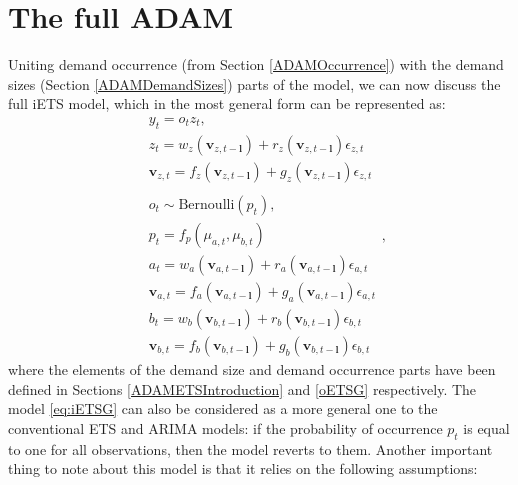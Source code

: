 \documentclass[
]{book}
\theoremstyle{definition}
\theoremstyle{definition}
\theoremstyle{definition}
\theoremstyle{definition}
\theoremstyle{remark}
\begin{document}
\hypertarget{ADAMIntermittentFull}{%
\section{The full ADAM}\label{ADAMIntermittentFull}}

Uniting demand occurrence (from Section \ref{ADAMOccurrence}) with the demand sizes (Section \ref{ADAMDemandSizes}) parts of the model, we can now discuss the full iETS model, which in the most general form can be represented as:
\begin{equation}
\begin{aligned}
& y_t = o_t z_t , \\
& {z}_{t} = w_z(\mathbf{v}_{z,t-\mathbf{l}}) + r_z(\mathbf{v}_{z,t-\mathbf{l}}) \epsilon_{z,t} \\
& \mathbf{v}_{z,t} = f_z(\mathbf{v}_{z,t-\mathbf{l}}) + g_z(\mathbf{v}_{z,t-\mathbf{l}}) \epsilon_{z,t} \\
& \\
& o_t \sim \text{Bernoulli} \left(p_t \right) , \\
& p_t = f_p(\mu_{a,t}, \mu_{b,t}) \\
& a_t = w_a(\mathbf{v}_{a,t-\mathbf{l}}) + r_a(\mathbf{v}_{a,t-\mathbf{l}}) \epsilon_{a,t} \\
& \mathbf{v}_{a,t} = f_a(\mathbf{v}_{a,t-\mathbf{l}}) + g_a(\mathbf{v}_{a,t-\mathbf{l}}) \epsilon_{a,t} \\
& b_t = w_b(\mathbf{v}_{b,t-\mathbf{l}}) + r_b(\mathbf{v}_{b,t-\mathbf{l}}) \epsilon_{b,t} \\
& \mathbf{v}_{b,t} = f_b(\mathbf{v}_{b,t-\mathbf{l}}) + g_b(\mathbf{v}_{b,t-\mathbf{l}}) \epsilon_{b,t}
\end{aligned} ,
\label{eq:iETSG}
\end{equation}
where the elements of the demand size and demand occurrence parts have been defined in Sections \ref{ADAMETSIntroduction} and \ref{oETSG} respectively. The model \eqref{eq:iETSG} can also be considered as a more general one to the conventional ETS and ARIMA models: if the probability of occurrence \(p_t\) is equal to one for all observations, then the model reverts to them. Another important thing to note about this model is that it relies on the following assumptions:
\end{document}
